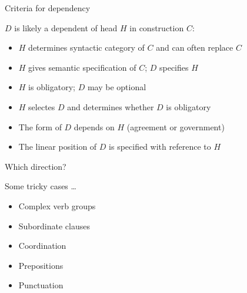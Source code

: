 \documentclass[compress]{beamer}
\begin{document}
\begin{frame}{Criteria for dependency}

  $D$ is likely a dependent of head $H$ in construction $C$:
  \begin{itemize}
    \item $H$ determines syntactic category of $C$ and can often replace $C$
    \item $H$ gives semantic specification of $C$; $D$ specifies $H$
    \item $H$ is obligatory; $D$ may be optional
    \item $H$ selectes $D$ and determines whether $D$ is obligatory
    \item The form of $D$ depends on $H$ (agreement or government)
    \item The linear position of $D$ is specified with reference to $H$
  \end{itemize}
\end{frame}


\begin{frame}{Which direction?}

Some tricky cases \dots
\begin{itemize}
  \item \alert<1-2>{Complex verb groups}
  \item \alert<3-4>{Subordinate clauses}
  \item \alert<5-6>{Coordination}
  \item \alert<7-8>{Prepositions}
  \item \alert<9-10>{Punctuation}
\end{itemize}

\vspace{1cm}

\footnotesize
\begin{mylinkage}{49}{1} %
\thicklines
{}

\end{mylinkage}


\end{frame}
\end{document}
